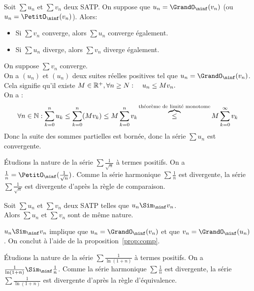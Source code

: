\documentclass{book}
\begin{document}
\begin{Proposition} \label{prop:comp}
Soit $\sum u_n$ et $\sum v_n$ deux SATP.
On suppose que $u_n = \GrandO_\ninf(v_n)$ (ou  $u_n = \PetitO_\ninf(v_n)$).
Alors:
\begin{itemize}
\item
  Si $\sum v_n$ converge, alors $\sum u_n$ converge également.
\item
  Si $\sum u_n$ diverge, alors $\sum v_n$ diverge également.
\end{itemize}
\end{Proposition} 
\begin{Demonstration}
On suppose $\sum v_n$ converge.\\
On a  $(u_n)$ et $(u_n)$ deux suites réelles positives tel que $u_n = \GrandO_\ninf(v_n)$. Cela signifie qu'il existe 
$ M\in \mathbb{R}^+,\forall n\geq N :\quad  u_n\leq M v_n.$\\
On a :
$$\forall n \in \mathbb{N} :	\sum_{k=0}^n u_k\leq \sum_{k=0}^n(M v_k) \leq M\sum_{k=0}^n v_k\overbrace{\leq}^{\text{théorème de limité monotome}} M\sum_{k=0}^{\infty} v_k $$
Donc la suite des sommes partielles est bornée, donc la série $\sum u_n$ est convergente. 
\end{Demonstration}
\begin{Exemple}
Étudions la nature de la  série $\sum \frac{1}{\sqrt{n}}$ à termes positifs. On a  $\frac{1}{n}=\PetitO_\ninf(\frac{1}{\sqrt{n}})$. Comme la série harmonique $\sum \frac 1 n$ est divergente, la série $\sum \frac{1}{\sqrt{n}}$ est divergente d'après la règle de comparaison. 
\end{Exemple}
\begin{Proposition}
Soit $\sum u_n$ et $\sum v_n$ deux SATP telles que $u_n \Sim_\ninf v_n$.\\
Alors $\sum u_n$ et $\sum v_n$ sont de même nature.
\end{Proposition}
\begin{Demonstration}
$u_n \Sim_\ninf v_n$ implique que $u_n= \GrandO_\ninf(v_n)$ et que $v_n= \GrandO_\ninf(u_n)$. On conclut à l'aide de la proposition~\ref{prop:comp}.
\end{Demonstration}
\begin{Exemple}
Étudions la nature de la  série $\sum \frac{1}{\ln(1+n)}$ à termes positifs. On a  $\frac{1}{\ln(1+n)}\Sim_\ninf \frac 1 n$. Comme la série harmonique $\sum \frac 1 n$ est divergente,   la série $\sum \frac{1}{\ln(1+n)}$ est divergente d'après la règle d'équivalence. 
\end{Exemple} 
\end{document}
